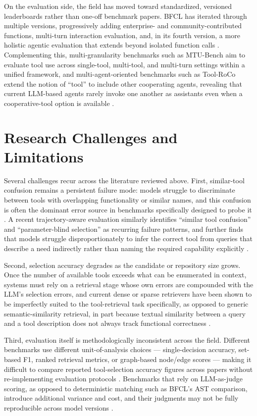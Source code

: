 \documentclass[acmsmall]{acmart}
\begin{document}
On the evaluation side, the field has moved toward standardized, versioned leaderboards rather than one-off benchmark papers. BFCL has iterated through multiple versions, progressively adding enterprise- and community-contributed functions, multi-turn interaction evaluation, and, in its fourth version, a more holistic agentic evaluation that extends beyond isolated function calls \citep{patil2025bfcl}. Complementing this, multi-granularity benchmarks such as MTU-Bench aim to evaluate tool use across single-tool, multi-tool, and multi-turn settings within a unified framework, and multi-agent-oriented benchmarks such as Tool-RoCo extend the notion of ``tool'' to include other cooperating agents, revealing that current LLM-based agents rarely invoke one another as assistants even when a cooperative-tool option is available \citep{wang2024mtubench,zhang2025toolroco}.

\section{Research Challenges and Limitations}
\label{sec:challenges}

Several challenges recur across the literature reviewed above. First, similar-tool confusion remains a persistent failure mode: models struggle to discriminate between tools with overlapping functionality or similar names, and this confusion is often the dominant error source in benchmarks specifically designed to probe it \citep{huang2024metatool}. A recent trajectory-aware evaluation similarly identifies ``similar tool confusion'' and ``parameter-blind selection'' as recurring failure patterns, and further finds that models struggle disproportionately to infer the correct tool from queries that describe a need indirectly rather than naming the required capability explicitly \citep{he2025trajectbench}.

Second, selection accuracy degrades as the candidate or repository size grows. Once the number of available tools exceeds what can be enumerated in context, systems must rely on a retrieval stage whose own errors are compounded with the LLM's selection errors, and current dense or sparse retrievers have been shown to be imperfectly suited to the tool-retrieval task specifically, as opposed to generic semantic-similarity retrieval, in part because textual similarity between a query and a tool description does not always track functional correctness \citep{shi2025toolretrieval}.

Third, evaluation itself is methodologically inconsistent across the field. Different benchmarks use different unit-of-analysis choices --- single-decision accuracy, set-based F1, ranked retrieval metrics, or graph-based node/edge scores --- making it difficult to compare reported tool-selection accuracy figures across papers without re-implementing evaluation protocols \citep{shen2023taskbench,mohammadi2025evaluation}. Benchmarks that rely on LLM-as-judge scoring, as opposed to deterministic matching such as BFCL's AST comparison, introduce additional variance and cost, and their judgments may not be fully reproducible across model versions \citep{patil2025bfcl}.
\end{document}
